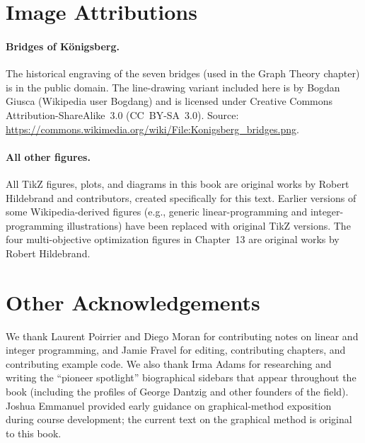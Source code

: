 \section*{Image Attributions}

\paragraph{Bridges of K\"onigsberg.}
The historical engraving of the seven bridges (used in the Graph
Theory chapter) is in the public domain. The line-drawing variant
included here is by Bogdan Giusca (Wikipedia user Bogdang) and is
licensed under Creative Commons Attribution-ShareAlike~3.0 (CC~BY-SA~3.0).
Source: \url{https://commons.wikimedia.org/wiki/File:Konigsberg_bridges.png}.

\paragraph{All other figures.}
All TikZ figures, plots, and diagrams in this book are original works
by Robert Hildebrand and contributors, created specifically for this
text. Earlier versions of some Wikipedia-derived figures
(e.g., generic linear-programming and integer-programming illustrations)
have been replaced with original TikZ versions. The four
multi-objective optimization figures in Chapter~13 are original
works by Robert Hildebrand.

\section*{Other Acknowledgements}

We thank Laurent Poirrier and Diego Moran for contributing notes on
linear and integer programming, and Jamie Fravel for editing,
contributing chapters, and contributing example code. We also thank
Irma Adams for researching and writing the ``pioneer spotlight''
biographical sidebars that appear throughout the book (including the
profiles of George Dantzig and other founders of the field). Joshua
Emmanuel provided early guidance on graphical-method exposition during
course development; the current text on the graphical method is
original to this book.


